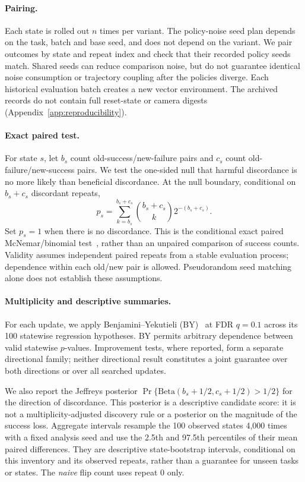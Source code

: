 \documentclass{article}
\begin{document}
\paragraph{Pairing.}
Each state is rolled out $n$ times per variant. The policy-noise seed plan depends on the
task, batch and base seed, and does not depend on the variant. We pair outcomes by state and
repeat index and check that their recorded policy seeds match. Shared seeds can reduce
comparison noise, but do not guarantee identical noise consumption or trajectory coupling
after the policies diverge. Each historical evaluation batch creates a new vector environment.
The archived records do not contain full reset-state or camera digests
(Appendix~\ref{app:reproducibility}).

\paragraph{Exact paired test.}
For state $s$, let $b_s$ count old-success/new-failure pairs and $c_s$ count
old-failure/new-success pairs. We test the one-sided null that harmful discordance is
no more likely than beneficial discordance. At the null boundary, conditional on
$b_s+c_s$ discordant repeats,
\begin{equation}
 p_s=\sum_{k=b_s}^{b_s+c_s}{b_s+c_s\choose k}2^{-(b_s+c_s)}.
 \label{eq:paired}
\end{equation}
Set $p_s=1$ when there is no discordance. This is the conditional exact paired
McNemar/binomial test~\citep{mcnemar1947sampling}, rather than an unpaired comparison of success counts.
Validity assumes independent paired repeats from a stable evaluation process; dependence
within each old/new pair is allowed. Pseudorandom seed matching alone does not establish
these assumptions.

\paragraph{Multiplicity and descriptive summaries.}
For each update, we apply Benjamini--Yekutieli (BY)~\citep{benjamini2001dependency}
at FDR $q=0.1$ across its 100 statewise regression hypotheses. BY permits arbitrary
dependence between valid statewise $p$-values. Improvement tests, where reported, form a
separate directional family; neither directional result constitutes a joint guarantee
over both directions or over all searched updates.

We also report the Jeffreys posterior
$\Pr\{\mathrm{Beta}(b_s+1/2,c_s+1/2)>1/2\}$ for the direction of discordance.
This posterior is a descriptive candidate score: it is not a multiplicity-adjusted
discovery rule or a posterior on the magnitude of the success loss.
Aggregate intervals resample the 100 observed states 4,000 times with a fixed analysis
seed and use the 2.5th and 97.5th percentiles of their mean paired differences.
They are descriptive state-bootstrap intervals, conditional on this inventory and its
observed repeats, rather than a guarantee for unseen tasks or states.
The \emph{naive} flip count uses repeat 0 only.
\end{document}
